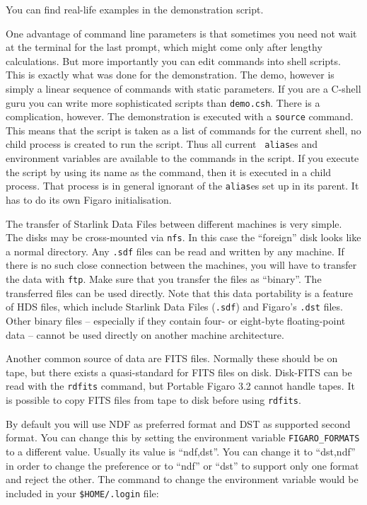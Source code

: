 You can find real-life examples in the demonstration script.

One advantage of command line parameters is that sometimes you need not
wait at the terminal for the last prompt, which might come only after
lengthy calculations. But more importantly you can edit commands into
shell scripts. This is exactly what was done for the demonstration. The
demo, however is simply a linear sequence of commands with static
parameters.  If you are a C-shell guru you can write more sophisticated
scripts than {\tt demo.csh}. There is a complication, however. The
demonstration is executed with a {\tt source} command. This means that
the script is taken as a list of commands for the current shell, no
child process is created to run the script. Thus all current {\tt
alias}es and environment variables are available to the commands in the
script. If you execute the script by using its name as the command, then
it is executed in a child process. That process is in general ignorant
of the {\tt alias}es set up in its parent. It has to do its own Figaro
initialisation.

The transfer of Starlink Data Files between different machines is very
simple.  The disks may be cross-mounted via {\tt nfs}. In this case the
``foreign'' disk looks like a normal directory. Any {\tt .sdf} files can
be read and written by any machine. If there is no such close connection
between the machines, you will have to transfer the data with {\tt ftp}.
Make sure that you transfer the files as ``binary''. The transferred
files can be used directly.  Note that this data portability is a
feature of HDS files, which include Starlink Data Files ({\tt .sdf}) and
Figaro's {\tt .dst} files. Other binary files -- especially if they
contain four- or eight-byte floating-point data -- cannot be used
directly on another machine architecture.

Another common source of data are FITS files.  Normally these should be
on tape, but there exists a quasi-standard for FITS files on disk.
Disk-FITS can be read with the {\tt rdfits} command, but Portable Figaro
3.2 cannot handle tapes.  It is possible to copy FITS files from
tape to disk before using {\tt rdfits}.

By default you will use NDF as preferred format and DST as supported
second format. You can change this by setting the environment variable
{\tt FIG\-ARO\-\_FOR\-MATS} to a different value. Usually its value is
``ndf,dst''.  You can change it to ``dst,ndf'' in order to change the
preference or to ``ndf'' or ``dst'' to support only one format and
reject the other. The command to change the environment variable would
be included in your {\tt \$HOME/.login} file:

